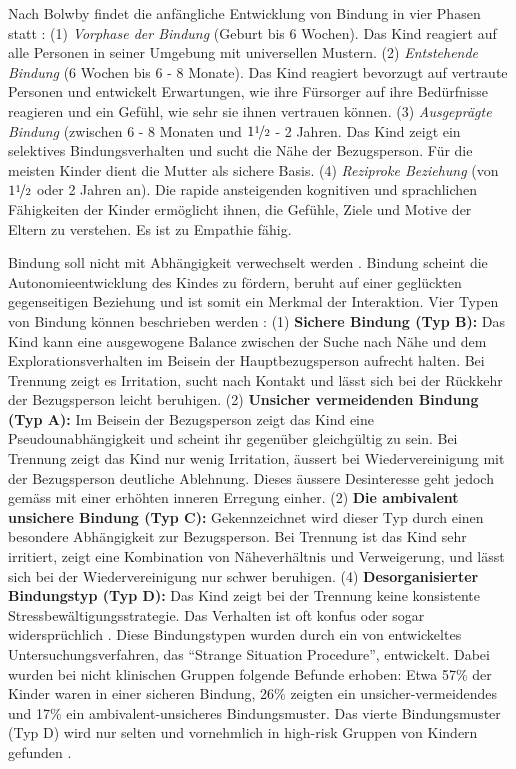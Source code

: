 Nach Bolwby findet die anfängliche Entwicklung von Bindung in vier Phasen statt \cite{Siegler2008}: (1) \textit{Vorphase der Bindung} (Geburt bis 6 Wochen). Das Kind reagiert auf alle Personen in seiner Umgebung mit universellen Mustern. (2) \textit{Entstehende Bindung} (6 Wochen bis 6 - 8 Monate). Das Kind reagiert bevorzugt auf vertraute Personen und entwickelt Erwartungen, wie ihre Fürsorger auf ihre Bedürfnisse reagieren und ein Gefühl, wie sehr sie ihnen vertrauen können. (3) \textit{Ausgeprägte Bindung} (zwischen 6 - 8 Monaten und $1\nicefrac{1}{2}$ - 2 Jahren. Das Kind zeigt ein selektives Bindungsverhalten und sucht die Nähe der Bezugsperson. Für die meisten Kinder dient die Mutter als sichere Basis. (4) \textit{Reziproke Beziehung} (von $1\nicefrac{1}{2}$ oder 2 Jahren an). Die rapide ansteigenden kognitiven und sprachlichen Fähigkeiten der Kinder ermöglicht ihnen, die Gefühle, Ziele und Motive der Eltern zu verstehen. Es ist zu Empathie fähig.

Bindung soll nicht mit Abhängigkeit verwechselt werden \cite{Schmidt1996}. Bindung scheint die Autonomieentwicklung des Kindes zu fördern, beruht auf einer geglückten gegenseitigen Beziehung und ist somit ein Merkmal der Interaktion. Vier Typen von Bindung können beschrieben werden \cite{Resch1999}: (1) \textbf{Sichere Bindung (Typ B):} Das Kind kann eine ausgewogene Balance zwischen der Suche nach Nähe und dem Explorationsverhalten im Beisein der Hauptbezugsperson aufrecht halten. Bei Trennung zeigt es Irritation, sucht nach Kontakt und lässt sich bei der Rückkehr der Bezugsperson leicht beruhigen. (2) \textbf{Unsicher vermeidenden Bindung (Typ A):} Im Beisein der Bezugsperson zeigt das Kind eine Pseudounabhängigkeit und scheint ihr gegenüber gleichgültig zu sein. Bei Trennung zeigt das Kind nur wenig Irritation, äussert bei Wiedervereinigung mit der Bezugsperson deutliche Ablehnung. Dieses äussere Desinteresse geht jedoch gemäss  mit einer erhöhten inneren Erregung einher. (2) \textbf{Die ambivalent unsichere Bindung (Typ C):} Gekennzeichnet wird dieser Typ durch einen besondere Abhängigkeit zur Bezugsperson. Bei Trennung ist das Kind sehr irritiert, zeigt eine Kombination von Näheverhältnis und Verweigerung, und lässt sich bei der Wiedervereinigung nur schwer beruhigen. (4) \textbf{Desorganisierter Bindungstyp (Typ D):} Das Kind zeigt bei der Trennung keine konsistente Stressbewältigungsstrategie. Das Verhalten ist oft konfus oder sogar widersprüchlich \cite{Siegler2008}. Diese Bindungstypen wurden durch ein von  entwickeltes Untersuchungsverfahren, das \enquote{Strange Situation Procedure}, entwickelt. Dabei wurden bei nicht klinischen Gruppen folgende Befunde erhoben: Etwa 57\% der Kinder waren in einer sicheren Bindung, 26\% zeigten ein unsicher-vermeidendes und 17\% ein ambivalent-unsicheres Bindungsmuster. Das vierte Bindungsmuster (Typ D) wird nur selten und vornehmlich in high-risk Gruppen von Kindern gefunden \cite{Resch1999}.

